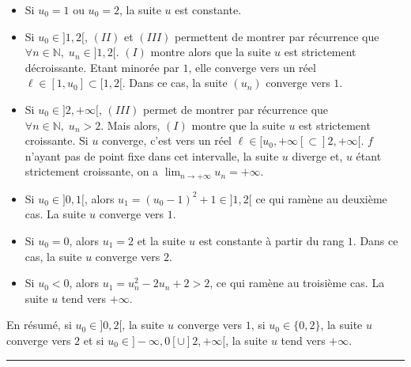 \documentclass[11pt,a4paper]{article}
\newcommand{\Nn}{\mathbb{N}} \newcommand{\N}{\mathbb{N}}
\newcommand{\fincorrection}{\vspace{1mm}\hrule\vspace*{7mm}}
\begin{document}
\begin{enumerate}
\begin{itemize}
\item[\textbf{1er cas.}] Si $u_0=1$ ou $u_0=2$, la suite $u$ est constante.
\item[\textbf{2ème cas.}] Si $u_0\in]1,2[$, $(II)$ et $(III)$ permettent de montrer par récurrence que $\forall n\in\Nn,\;u_n\in]1,2[$. $(I)$ montre alors que la suite $u$ est strictement décroissante. Etant minorée par $1$, elle converge vers un réel $\ell\in[1,u_0]\subset[1,2[$. Dans ce cas, la suite $(u_n)$ converge vers $1$.
\item[\textbf{3ème cas.}] Si $u_0\in]2,+\infty[$, $(III)$ permet de montrer par récurrence que $\forall n\in\Nn,\;u_n>2$. Mais alors, $(I)$ montre que la suite $u$ est strictement croissante. Si $u$ converge, c'est vers un réel $\ell\in[u_0,+\infty[\subset]2,+\infty[$. $f$ n'ayant pas de point fixe dans cet intervalle, la suite $u$ diverge et, $u$ étant strictement croissante, on a $\lim_{n\rightarrow +\infty}u_n=+\infty$.
\item[\textbf{4ème cas.}] Si $u_0\in]0,1[$, alors $u_1=(u_0-1)^2+1\in]1,2[$ ce qui ramène au deuxième cas. La suite $u$ converge vers $1$.
\item[\textbf{5ème cas.}] Si $u_0=0$, alors $u_1=2$ et la suite $u$ est constante à partir du rang $1$. Dans ce cas, la suite $u$ converge vers $2$.
\item[\textbf{6ème cas.}] Si $u_0<0$, alors $u_1=u_n^2-2u_n+2>2$, ce qui ramène au troisième cas. La suite $u$ tend vers $+\infty$.
\end{itemize}

En résumé, si $u_0\in]0,2[$, la suite $u$ converge vers $1$, si $u_0\in\{0,2\}$, la suite $u$ converge vers $2$ et si $u_0\in]-\infty,0[\cup]2,+\infty[$, la suite $u$ tend vers $+\infty$.


\end{enumerate}
\fincorrection
\end{document}
